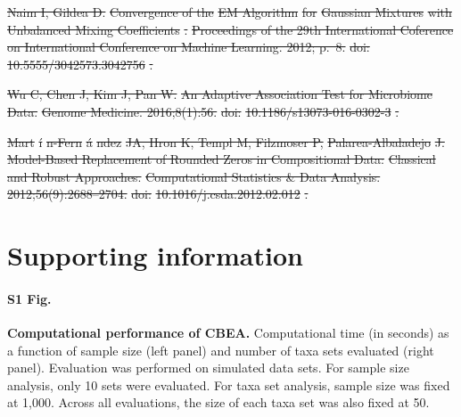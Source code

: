 \documentclass[10pt,letterpaper]{article}
\providecommand{\DIFdeltex}[1]{{\protect\color{red}\sout{#1}}}                      %
\providecommand{\DIFaddbegin}{} %
\providecommand{\DIFaddend}{} %
\providecommand{\DIFdelbegin}{} %
\providecommand{\DIFdelend}{} %
\providecommand{\DIFdel}[1]{\texorpdfstring{\DIFdeltex{#1}}{}} %
\newcommand{\DIFscaledelfig}{0.5}
\newlength{\DIFdelgraphicswidth} %
\newlength{\DIFdelgraphicsheight} %
\newcommand{\DIFaddincludegraphics}[2][]{{\color{blue}\fbox{\DIFOincludegraphics[#1]{#2}}}} %
\newcommand{\DIFdelincludegraphics}[2][]{%
\sbox{\DIFdelgraphicsbox}{\DIFOincludegraphics[#1]{#2}}%
\settoboxwidth{\DIFdelgraphicswidth}{\DIFdelgraphicsbox} %
\settoboxtotalheight{\DIFdelgraphicsheight}{\DIFdelgraphicsbox} %
\scalebox{\DIFscaledelfig}{%
\parbox[b]{\DIFdelgraphicswidth}{\usebox{\DIFdelgraphicsbox}\\[-\baselineskip] \rule{\DIFdelgraphicswidth}{0em}}\llap{\resizebox{\DIFdelgraphicswidth}{\DIFdelgraphicsheight}{%
\setlength{\unitlength}{\DIFdelgraphicswidth}%
\begin{picture}(1,1)%
\thicklines\linethickness{2pt} %
{\color[rgb]{1,0,0}\put(0,0){\framebox(1,1){}}}%
{\color[rgb]{1,0,0}\put(0,0){\line( 1,1){1}}}%
{\color[rgb]{1,0,0}\put(0,1){\line(1,-1){1}}}%
\end{picture}%
}\hspace*{3pt}}} %
} %
\DeclareRobustCommand{\DIFaddbegin}{\DIFOaddbegin \let\includegraphics\DIFaddincludegraphics} %
\DeclareRobustCommand{\DIFaddend}{\DIFOaddend \let\includegraphics\DIFOincludegraphics} %
\DeclareRobustCommand{\DIFdelbegin}{\DIFOdelbegin \let\includegraphics\DIFdelincludegraphics} %
\DeclareRobustCommand{\DIFdelend}{\DIFOaddend \let\includegraphics\DIFOincludegraphics} %
\begin{document}
\DIFdel{Naim I, Gildea D.
}%
\DIFdel{Convergence of the }%
\DIFdel{EM Algorithm}%
\DIFdel{for }%
\DIFdel{Gaussian Mixtures}%
\DIFdel{with
  }%
\DIFdel{Unbalanced Mixing Coefficients}%
\DIFdel{.
}%
\DIFdel{Proceedings of the 29th International Coference on International
  Conference on Machine Learning. 2012; p.~8.
}%
\DIFdel{doi:}%
\DIFdel{10.5555/3042573.3042756}%
\DIFdel{.
}%

\DIFdel{Wu C, Chen J, Kim J, Pan W.
}%
\DIFdel{An Adaptive Association Test for Microbiome Data.
}%
\DIFdel{Genome Medicine. 2016;8(1):56.
}%
\DIFdel{doi:}%
\DIFdel{10.1186/s13073-016-0302-3}%
\DIFdel{.
}%

\DIFdel{Mart}%
\DIFdel{\'i}%
\DIFdel{n-Fern}%
\DIFdel{\'a}%
\DIFdel{ndez}%
\DIFdel{JA, Hron K, Templ M, Filzmoser P,
  }%
\DIFdel{Palarea-Albaladejo}%
\DIFdel{J.
}%
\DIFdel{Model-Based Replacement of Rounded Zeros in Compositional Data:
  }%
\DIFdel{Classical}%
\DIFdel{and Robust Approaches.
}%
\DIFdel{Computational Statistics \& Data Analysis. 2012;56(9):2688--2704.
}%
\DIFdel{doi:}%
\DIFdel{10.1016/j.csda.2012.02.012}%
\DIFdel{.
}%


\DIFdelend \section*{Supporting information}

\paragraph*{S1 Fig.}
\DIFdelbegin %
\DIFdelend \DIFaddbegin \label{S1_Fig}
{\bf Computational performance of CBEA.} \DIFaddend Computational time (in seconds) as a function of sample size (left panel) and number of taxa sets evaluated (right panel). Evaluation was performed on simulated data sets. For sample size analysis, only 10 sets were evaluated. For taxa set analysis, sample size was fixed at 1,000. Across all evaluations, the size of each taxa set was also fixed at 50. 
\end{document}
